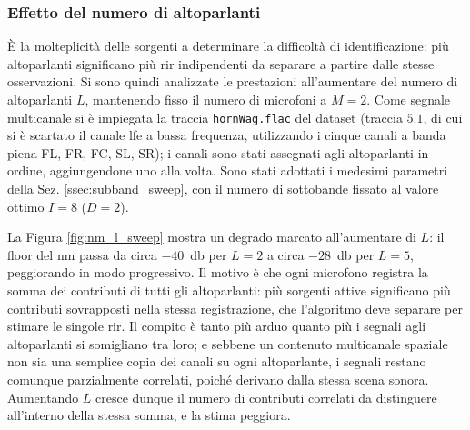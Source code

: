 \documentclass[11pt,a4paper]{article}
\begin{document}
	\subsubsection{Effetto del numero di altoparlanti}\label{ssec:l_sweep}
	È la molteplicità delle sorgenti a determinare la difficoltà di identificazione: più altoparlanti significano più \ac{rir} indipendenti da separare a partire dalle stesse osservazioni. 
	Si sono quindi analizzate le prestazioni all'aumentare del numero di altoparlanti $L$, mantenendo fisso il numero di microfoni a $M = 2$. 
	Come segnale multicanale si è impiegata la traccia \texttt{hornWag.flac} del dataset \cite{ebu_tech3324} (traccia $5.1$, di cui si è scartato il canale \ac{lfe} a bassa frequenza, utilizzando i cinque canali a banda piena FL, FR, FC, SL, SR); i canali sono stati assegnati agli altoparlanti in ordine, aggiungendone uno alla volta. 
	Sono stati adottati i medesimi parametri della Sez. \ref{ssec:subband_sweep}, con il numero di sottobande fissato al valore ottimo $I = 8$ ($D = 2$). 
	
	La Figura \ref{fig:nm_l_sweep} mostra un degrado marcato all'aumentare di $L$: il floor del \ac{nm} passa da circa $-40$~\si{\decibel} per $L = 2$ a circa $-28$~\si{\decibel} per $L = 5$, peggiorando in modo progressivo. 
	Il motivo è che ogni microfono registra la somma dei contributi di tutti gli altoparlanti: più sorgenti attive significano più contributi sovrapposti nella stessa registrazione, che l'algoritmo deve separare per stimare le singole \ac{rir}. 
	Il compito è tanto più arduo quanto più i segnali agli altoparlanti si somigliano tra loro; e sebbene un contenuto multicanale spaziale non sia una semplice copia dei canali su ogni altoparlante, i segnali restano comunque parzialmente correlati, poiché derivano dalla stessa scena sonora. 
	Aumentando $L$ cresce dunque il numero di contributi correlati da distinguere all'interno della stessa somma, e la stima peggiora.
	
\end{document}
